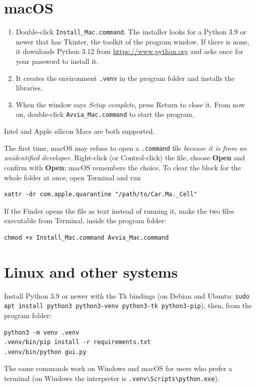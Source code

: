 \documentclass[fontsize=10.5pt,paper=a4,parskip=half,headings=normal,numbers=noenddot,
  open=any,captions=tableheading]{scrreprt}
\newcommand{\btn}[1]{\textsf{\textbf{#1}}}
\newcommand{\file}[1]{\texttt{#1}}
\begin{document}
\section{macOS}

\begin{enumerate}
\item Double-click \file{Install\_Mac.command}. The installer looks for a Python 3.9 or newer that has Tkinter, the toolkit of the program window. If there is none, it downloads Python 3.12 from \url{https://www.python.org} and asks once for your password to install it.
\item It creates the environment \file{.venv} in the program folder and installs the libraries.
\item When the window says \emph{Setup complete}, press Return to close it. From now on, double-click \file{Avvia\_Mac.command} to start the program.
\end{enumerate}
Intel and Apple silicon Macs are both supported.

\begin{note}[Gatekeeper]
The first time, macOS may refuse to open a \file{.command} file \emph{because it is from an unidentified developer}. Right-click (or Control-click) the file, choose \btn{Open} and confirm with \btn{Open}; macOS remembers the choice. To clear the block for the whole folder at once, open Terminal and run
\begin{verbatim}
xattr -dr com.apple.quarantine "/path/to/Car.Ma._Cell"
\end{verbatim}
If the Finder opens the file as text instead of running it, make the two files executable from Terminal, inside the program folder:
\begin{verbatim}
chmod +x Install_Mac.command Avvia_Mac.command
\end{verbatim}
\end{note}

\section{Linux and other systems}

Install Python 3.9 or newer with the Tk bindings (on Debian and Ubuntu: \texttt{sudo apt install python3 python3-venv python3-tk python3-pip}), then, from the program folder:
\begin{verbatim}
python3 -m venv .venv
.venv/bin/pip install -r requirements.txt
.venv/bin/python gui.py
\end{verbatim}
The same commands work on Windows and macOS for users who prefer a terminal (on Windows the interpreter is \file{.venv\textbackslash Scripts\textbackslash python.exe}).
\end{document}

